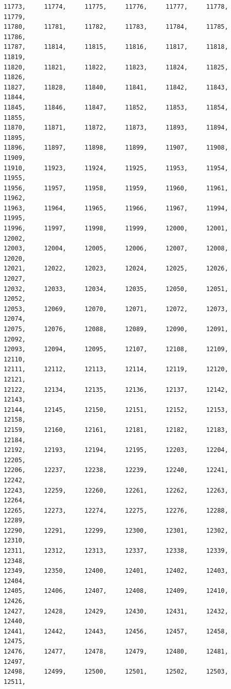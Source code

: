 \documentclass[a4paper,11pt]{report}
\begin{document}
\begin{verbatim}
11773,     11774,     11775,     11776,     11777,     11778,     11779,     
11780,     11781,     11782,     11783,     11784,     11785,     11786,     
11787,     11814,     11815,     11816,     11817,     11818,     11819,     
11820,     11821,     11822,     11823,     11824,     11825,     11826,     
11827,     11828,     11840,     11841,     11842,     11843,     11844,     
11845,     11846,     11847,     11852,     11853,     11854,     11855,     
11870,     11871,     11872,     11873,     11893,     11894,     11895,     
11896,     11897,     11898,     11899,     11907,     11908,     11909,     
11910,     11923,     11924,     11925,     11953,     11954,     11955,     
11956,     11957,     11958,     11959,     11960,     11961,     11962,     
11963,     11964,     11965,     11966,     11967,     11994,     11995,     
11996,     11997,     11998,     11999,     12000,     12001,     12002,     
12003,     12004,     12005,     12006,     12007,     12008,     12020,     
12021,     12022,     12023,     12024,     12025,     12026,     12027,     
12032,     12033,     12034,     12035,     12050,     12051,     12052,     
12053,     12069,     12070,     12071,     12072,     12073,     12074,     
12075,     12076,     12088,     12089,     12090,     12091,     12092,     
12093,     12094,     12095,     12107,     12108,     12109,     12110,     
12111,     12112,     12113,     12114,     12119,     12120,     12121,     
12122,     12134,     12135,     12136,     12137,     12142,     12143,     
12144,     12145,     12150,     12151,     12152,     12153,     12158,     
12159,     12160,     12161,     12181,     12182,     12183,     12184,     
12192,     12193,     12194,     12195,     12203,     12204,     12205,     
12206,     12237,     12238,     12239,     12240,     12241,     12242,     
12243,     12259,     12260,     12261,     12262,     12263,     12264,     
12265,     12273,     12274,     12275,     12276,     12288,     12289,     
12290,     12291,     12299,     12300,     12301,     12302,     12310,     
12311,     12312,     12313,     12337,     12338,     12339,     12348,     
12349,     12350,     12400,     12401,     12402,     12403,     12404,     
12405,     12406,     12407,     12408,     12409,     12410,     12426,     
12427,     12428,     12429,     12430,     12431,     12432,     12440,     
12441,     12442,     12443,     12456,     12457,     12458,     12475,     
12476,     12477,     12478,     12479,     12480,     12481,     12497,     
12498,     12499,     12500,     12501,     12502,     12503,     12511,     

\end{verbatim}
\end{document}
